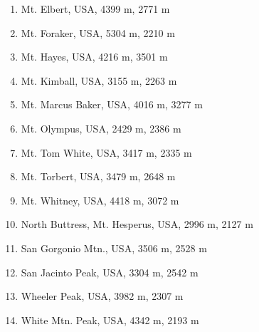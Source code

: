 \documentclass[10pt,twocolumn,letterpaper]{article}
\begin{document}
\begin{flushleft}
\begin{enumerate}
    \item Mt. Elbert, USA, 4399 m, 2771 m
    \item Mt. Foraker, USA, 5304 m, 2210 m
    \item Mt. Hayes, USA, 4216 m, 3501 m
    \item Mt. Kimball, USA, 3155 m, 2263 m
    \item Mt. Marcus Baker, USA, 4016 m, 3277 m
    \item Mt. Olympus, USA, 2429 m, 2386 m
    \item Mt. Tom White, USA, 3417 m, 2335 m
    \item Mt. Torbert, USA, 3479 m, 2648 m
    \item Mt. Whitney, USA, 4418 m, 3072 m
    \item North Buttress, Mt. Hesperus, USA, 2996 m, 2127 m
    \item San Gorgonio Mtn., USA, 3506 m, 2528 m
    \item San Jacinto Peak, USA, 3304 m, 2542 m
    \item Wheeler Peak, USA, 3982 m, 2307 m
    \item White Mtn. Peak, USA, 4342 m, 2193 m
\end{enumerate}
\end{flushleft}
\end{document}
